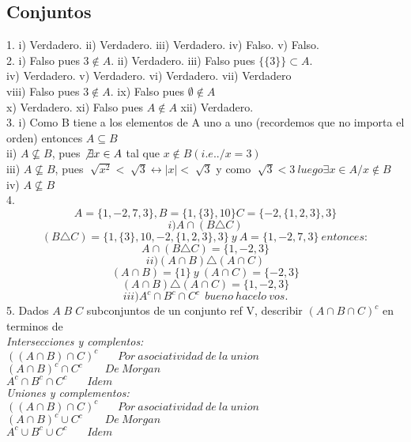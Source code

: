 \documentclass[a4paper,11pt]{article}
\begin{document}
\subsection{Conjuntos}
1. i) Verdadero. ii) Verdadero. iii) Verdadero. iv) Falso. v) Falso.\\
2. i) Falso pues \(3\not\in A\). ii) Verdadero. iii) Falso pues \(\lbrace\lbrace3\rbrace\rbrace\subset A\).\\
 iv) Verdadero. v) Verdadero. vi) Verdadero. vii) Verdadero \\
 viii) Falso pues \(3\notin A\). ix) Falso pues \(\emptyset \not\in A\) \\
 x) Verdadero. xi) Falso pues \(A \not\in A\) xii) Verdadero. \\
3.
i) Como B tiene a los elementos de A uno a uno (recordemos que no importa el orden) entonces \(A \subseteq B\)\\
ii) \(A \not \subseteq B\), pues \(\not\exists x \in A\) tal que \(x \not\in B (i.e. ./x = 3)\)\\
iii) \(A \not \subseteq B\), pues \(\sqrt[]{x^2}<\sqrt[]{3}\leftrightarrow |x|<\sqrt[]{3} \) y como \(\sqrt[]{3}<3 \ luego \exists x\in A / x \not\in B\)\\
iv) \(A \not \subseteq B\)\\
4. \[
A=\{1, -2, 7, 3\} , B=\{1, \{3\}, 10\} C=\{-2, \{1,2,3\}, 3\}
\]
\[i) A \cap (B \triangle C)\]
\[(B \triangle C) = \{1,\{3\}, 10, -2, \{1,2,3\},3\} \:y\: A=\{1, -2, 7, 3\}\:entonces: \]
\[A \cap (B \triangle C) = \{1, -2, 3\}\]
\[ii) (A \cap B) \triangle (A \cap C)\]
\[(A \cap B)=\{1\}\:y\:(A \cap C)=\{-2,3\}\]
\[(A \cap B) \triangle (A \cap C)=\{1,-2,3\}\]
\[iii) A^{c}\cap B^{c}\cap C^{c}\:\:bueno \:hacelo\: vos.\]
5. Dados \(A\;B\;C\) subconjuntos de un conjunto ref V, describir \((A\cap B\cap C)^{c}\) en terminos de\\
\textit{Intersecciones y complentos:}\\
\(((A\cap B)\cap C)^{c}\:\:\:\:\:\:\:\:Por\:asociatividad\: de\: la\: union\)\\
\((A\cap B)^{c}\cap C^{c}\:\:\:\:\:\:\:\:\:De\: Morgan\)\\
\(A^{c}\cap B^{c}\cap C^{c}\:\:\:\:\:\:\:\:Idem\)\\
\textit{Uniones y complementos:}\\
\(((A\cap B)\cap C)^{c}\:\:\:\:\:\:\:\:Por\:asociatividad\: de\: la\: union\)\\
\((A\cap B)^{c}\cup C^{c}\:\:\:\:\:\:\:\:\:De\: Morgan\)\\
\(A^{c}\cup B^{c}\cup C^{c}\:\:\:\:\:\:\:\:Idem\)\\
\end{document}
